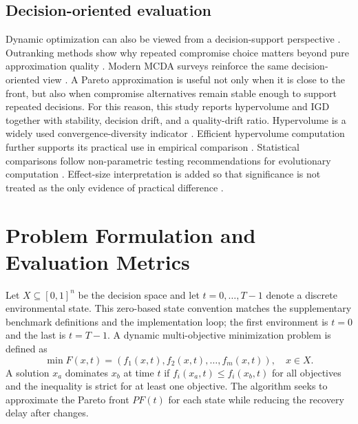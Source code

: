 \documentclass[1p,times]{elsarticle}
\begin{document}
\subsection{Decision-oriented evaluation}
Dynamic optimization can also be viewed from a decision-support perspective \cite{hwang1981}. Outranking methods show why repeated compromise choice matters beyond pure approximation quality \cite{roy1996}. Modern MCDA surveys reinforce the same decision-oriented view \cite{greco2016}. A Pareto approximation is useful not only when it is close to the front, but also when compromise alternatives remain stable enough to support repeated decisions. For this reason, this study reports hypervolume and IGD together with stability, decision drift, and a quality-drift ratio. Hypervolume is a widely used convergence-diversity indicator \cite{zitzler1999}. Efficient hypervolume computation further supports its practical use in empirical comparison \cite{fonseca2006}. Statistical comparisons follow non-parametric testing recommendations for evolutionary computation \cite{derrac2011}. Effect-size interpretation is added so that significance is not treated as the only evidence of practical difference \cite{sawilowsky2009}.




\section{Problem Formulation and Evaluation Metrics}
Let $X \subseteq [0,1]^n$ be the decision space and let $t=0,\ldots,T-1$ denote a discrete environmental state. This zero-based state convention matches the supplementary benchmark definitions and the implementation loop; the first environment is $t=0$ and the last is $t=T-1$. A dynamic multi-objective minimization problem is defined as
\begin{equation}
\min F(x,t)=\left(f_1(x,t),f_2(x,t),\ldots,f_m(x,t)\right), \quad x \in X.
\end{equation}
A solution $x_a$ dominates $x_b$ at time $t$ if $f_i(x_a,t)\leq f_i(x_b,t)$ for all objectives and the inequality is strict for at least one objective. The algorithm seeks to approximate the Pareto front $PF(t)$ for each state while reducing the recovery delay after changes.
\end{document}
